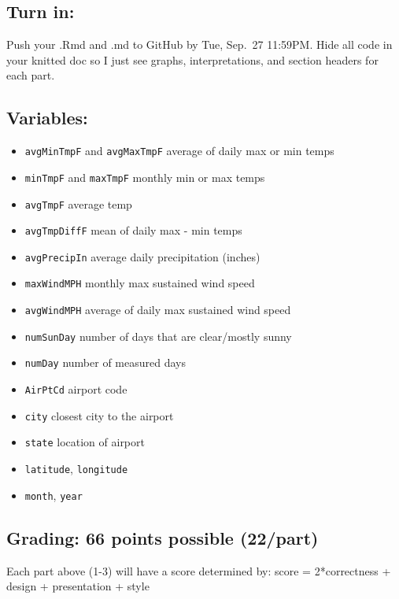 \documentclass[
]{article}
\providecommand{\tightlist}{%
  \setlength{\itemsep}{0pt}\setlength{\parskip}{0pt}}
\begin{document}
\hypertarget{turn-in}{%
\subsection{Turn in:}\label{turn-in}}

Push your .Rmd and .md to GitHub by Tue, Sep.~27 11:59PM. Hide all code
in your knitted doc so I just see graphs, interpretations, and section
headers for each part.

\hypertarget{variables}{%
\subsection{Variables:}\label{variables}}

\begin{itemize}
\tightlist
\item
  \texttt{avgMinTmpF} and \texttt{avgMaxTmpF} average of daily max or
  min temps
\item
  \texttt{minTmpF} and \texttt{maxTmpF} monthly min or max temps
\item
  \texttt{avgTmpF} average temp
\item
  \texttt{avgTmpDiffF} mean of daily max - min temps
\item
  \texttt{avgPrecipIn} average daily precipitation (inches)
\item
  \texttt{maxWindMPH} monthly max sustained wind speed
\item
  \texttt{avgWindMPH} average of daily max sustained wind speed
\item
  \texttt{numSunDay} number of days that are clear/mostly sunny
\item
  \texttt{numDay} number of measured days
\item
  \texttt{AirPtCd} airport code
\item
  \texttt{city} closest city to the airport
\item
  \texttt{state} location of airport
\item
  \texttt{latitude}, \texttt{longitude}
\item
  \texttt{month}, \texttt{year}
\end{itemize}

\hypertarget{grading-66-points-possible-22part}{%
\subsection{Grading: 66 points possible
(22/part)}\label{grading-66-points-possible-22part}}

Each part above (1-3) will have a score determined by: score =
2*correctness + design + presentation + style
\end{document}
